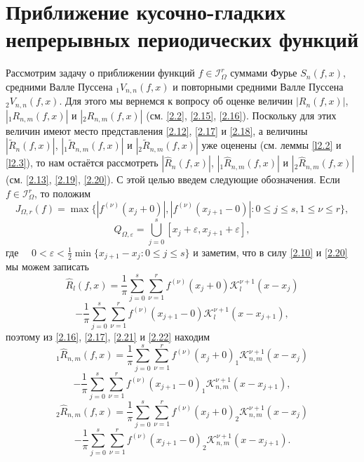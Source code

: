 \section{Приближение кусочно-гладких непрерывных периодических функций}\label{s3}


Рассмотрим задачу о приближении функций $f\in\mathcal{ I}^r_\Omega$ суммами Фурье
$S_n(f,x)$, средними Валле Пуссена  $_1V_{n,n}(f,x)$ и повторными средними Валле Пуссена $_2V_{n,n}(f,x)$. Для этого мы вернемся  к вопросу  об оценке величин  $ |R_n(f,x)|$,
 $| _1R_{n,m}(f,x)|$ и $|_2R_{n,m}(f,x)|$ (см. \eqref{2.2},  \eqref{2.15}, \eqref{2.16}). Поскольку для этих величин имеют место представления \eqref{2.12}, \eqref{2.17} и \eqref{2.18}, а величины $|\tilde R_n(f,x)|$, $|_1\tilde R_{n,m}(f,x)|$ и  $|_2\tilde R_{n,m}(f,x)|$ уже оценены (см. леммы \ref{l2.2} и \ref{l2.3}), то нам остаётся рассмотреть
 $|\hat R_n(f,x)|$, $|_1\hat R_{n,m}(f,x)|$ и  $|_2\hat R_{n,m}(f,x)|$ (см. \eqref{2.13}, \eqref{2.19},   \eqref{2.20}). С этой целью введем следующие обозначения. Если $f\in\mathcal{ I}^r_\Omega$, то положим
\begin{equation}\label{3.1}
J_{\Omega,r}(f)=\max\{|f^{(\nu)}(x_j+0)|,|f^{(\nu)}(x_{j+1}-0)|: 0\le j\le s, 1\le\nu\le r\},
\end{equation}
\begin{equation}\label{3.2}
Q_{\Omega,\varepsilon}=\bigcup_{j=0}^s[x_j+\varepsilon,x_{j+1}+\varepsilon],
\end{equation}
где $\quad 0<\varepsilon<\frac12\min\{x_{j+1}-x_{j}:0\le j\le s\}$ и
заметим, что в силу \eqref{2.10} и \eqref{2.20} мы можем записать
$$
 \hat R_l(f,x)=\frac{1}{\pi}\sum_{j=0}^s
\sum_{\nu=1}^rf^{(\nu)}(x_j+0)\mathcal{ K}_l^{\nu+1}(x-x_j)
$$
\begin{equation}\label{3.3}
-\frac{1}{\pi}\sum_{j=0}^s
\sum_{\nu=1}^r f^{(\nu)}(x_{j+1}-0)\mathcal{ K}_l^{\nu+1}(x-x_{j+1}),
\end{equation}
поэтому из \eqref{2.16}, \eqref{2.17}, \eqref{2.21} и \eqref{2.22} находим
$$
 _1\hat R_{n,m}(f,x)=\frac{1}{\pi}\sum_{j=0}^s
\sum_{\nu=1}^rf^{(\nu)}(x_j+0)_1\mathcal{ K}_{n,m}^{\nu+1}(x-x_j)
$$
\begin{equation}\label{3.4}
-\frac{1}{\pi}\sum_{j=0}^s
\sum_{\nu=1}^r f^{(\nu)}(x_{j+1}-0)_1\mathcal{ K}_{n,m}^{\nu+1}(x-x_{j+1}),
\end{equation}
$$
 _2\hat R_{n,m}(f,x)=\frac{1}{\pi}\sum_{j=0}^s
\sum_{\nu=1}^rf^{(\nu)}(x_j+0)_2\mathcal{ K}_{n,m}^{\nu+1}(x-x_j)
$$
\begin{equation}\label{3.5}
-\frac{1}{\pi}\sum_{j=0}^s
\sum_{\nu=1}^r f^{(\nu)}(x_{j+1}-0)_2\mathcal{ K}_{n,m}^{\nu+1}(x-x_{j+1}).
\end{equation}
